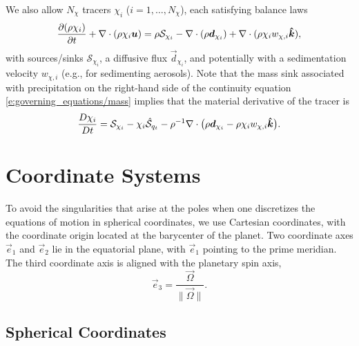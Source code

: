 \documentclass{report}
\begin{document}
We also allow $N_\chi$ tracers $\chi_i$ ($i=1, \dots, N_\chi$), each satisfying balance laws
\begin{equation}
\frac{\partial (\rho \chi_i)}{\partial t} + \nabla \cdot \left(\rho \chi_i \boldsymbol{{u}} \right) = \rho \mathcal{S}_{\chi_i} - \nabla \cdot (\rho \boldsymbol{{d}}_{\chi_i}) + \nabla \cdot (\rho \chi_{i} w_{\chi, i} \boldsymbol{{\hat k}}),   
\label{e:tracers}
\end{equation}
with sources/sinks $\mathcal{S}_{\chi_i}$, a diffusive flux $\vec{d}_{\chi_i}$, and potentially with a sedimentation velocity $w_{\chi, i}$ (e.g., for sedimenting aerosols). Note that the mass sink associated with precipitation on the right-hand side of the continuity equation \eqref{e:governing_equations/mass} implies that the material derivative of the tracer is 
\[
\frac{D\chi_i}{Dt} = \mathcal{S}_{\chi_i} - \chi_i \mathcal{\hat S}_{q_t} - \rho^{-1} \nabla \cdot \bigl(\rho \boldsymbol{{d}}_{\chi_i} - \rho \chi_{i} w_{\chi, i} \boldsymbol{{\hat k}}\bigr).
\]
 
\section{Coordinate Systems}

To avoid the singularities that arise at the poles when one discretizes the equations of motion in spherical coordinates, we use Cartesian coordinates, with the coordinate origin located at the barycenter of the planet. Two coordinate axes $\vec{e}_1$ and $\vec{e}_2$ lie in the equatorial plane, with $\vec{e}_1$ pointing to the prime meridian. The third coordinate axis is aligned with the planetary spin axis,
\[
\vec{e}_3 = \frac{\vec{\Omega}}{\|\vec{\Omega}\|}.
\]

\subsection{Spherical Coordinates}
\end{document}

